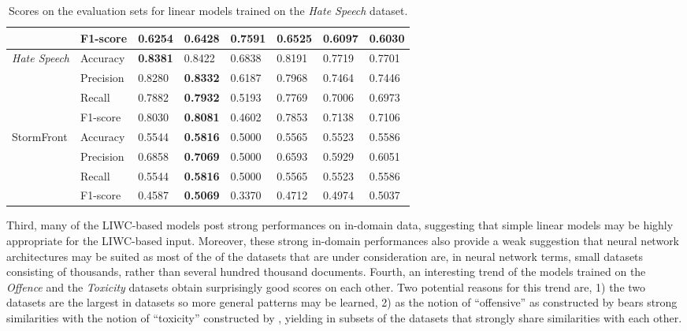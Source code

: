\begin{table}[]
\begin{minipage}{0.42\paperheight}
{\begin{tabular}{ll|ll|ll|ll}
                                           & F1-score  & 0.6254       & 0.6428           & \bf{0.7591} & 0.6525        & 0.6097      & 0.6030      \\ \hline
    \multirow{4}{*}{\textit{Hate Speech}}  & Accuracy  & \bf{0.8381}  & 0.8422           & 0.6838      & 0.8191        & 0.7719      & 0.7701      \\
                                           & Precision & 0.8280       & \bf{0.8332}      & 0.6187      & 0.7968        & 0.7464      & 0.7446      \\
                                           & Recall    & 0.7882       & \bf{0.7932}      & 0.5193      & 0.7769        & 0.7006      & 0.6973      \\
                                           & F1-score  & 0.8030       & \bf{0.8081}      & 0.4602      & 0.7853        & 0.7138      & 0.7106      \\ \hline
    \multirow{4}{*}{StormFront}            & Accuracy  & 0.5544       & \bf{0.5816}      & 0.5000      & 0.5565        & 0.5523      & 0.5586      \\
                                           & Precision & 0.6858       & \bf{0.7069}      & 0.5000      & 0.6593        & 0.5929      & 0.6051      \\
                                           & Recall    & 0.5544       & \bf{0.5816}      & 0.5000      & 0.5565        & 0.5523      & 0.5586      \\
                                           & F1-score  & 0.4587       & \bf{0.5069}      & 0.3370      & 0.4712        & 0.4974      & 0.5037
    \end{tabular}%
    }
    \caption{Scores on the evaluation sets for linear models trained on the \textit{Hate Speech} dataset.}
    \label{tab:linear_hatespeech_baselines}
\end{minipage}
\end{table}

Third, many of the LIWC-based models post strong performances on in-domain data, suggesting that simple linear models may be highly appropriate for the LIWC-based input.
Moreover, these strong in-domain performances also provide a weak suggestion that neural network architectures may be suited as most of the of the datasets that are under consideration are, in neural network terms, small datasets consisting of thousands, rather than several hundred thousand documents.
Fourth, an interesting trend of the models trained on the \textit{Offence} and the \textit{Toxicity} datasets obtain surprisingly good scores on each other. Two potential reasons for this trend are, 1) the two datasets are the largest in datasets so more general patterns may be learned, 2) as the notion of ``offensive'' as constructed by \citet{Davidson:2017} bears strong similarities with the notion of ``toxicity'' constructed by \citet{Wulczyn:2017}, yielding in subsets of the datasets that strongly share similarities with each other.

